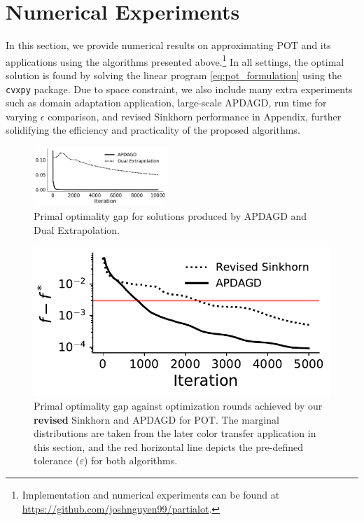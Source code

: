 \section{Numerical Experiments}
In this section, we provide numerical results on approximating POT and its applications using the algorithms presented above.\footnote{Implementation and numerical experiments can be found at \url{https://github.com/joshnguyen99/partialot}.} In all settings, the optimal solution is found by solving the linear program \eqref{eq:pot_formulation} using the \texttt{cvxpy} package. Due to space constraint, we also include many extra experiments such as domain adaptation application, large-scale APDAGD, run time for varying $\epsilon$ comparison, and revised Sinkhorn performance in Appendix, further solidifying the efficiency and practicality of the proposed algorithms.
\begin{figure}
    \centering
    \includegraphics[width=0.45\textwidth]{figs/de_vs_apdagd_primal_gap.pdf}
    \caption{Primal optimality gap for solutions produced by APDAGD and Dual Extrapolation.}
    \label{fig:de_vs_apdagd}
\end{figure}
\begin{figure}
    \centering
    \includegraphics[width=0.9\linewidth]{figs/color_transfer_primal_opt_feasible.pdf}
    \caption{Primal optimality gap against optimization rounds achieved by our \textbf{revised} Sinkhorn and APDAGD for POT. The marginal distributions are taken from the later color transfer application in this section, and the red horizontal line depicts the pre-defined tolerance ($\varepsilon$) for both algorithms.}
    \label{fig:Feasible_Sinkhorn}
\end{figure}
